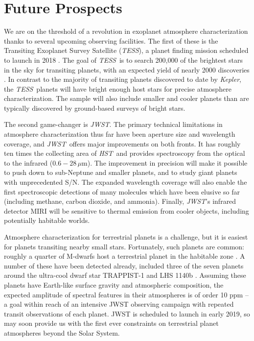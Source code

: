 \documentclass[graybox,natbib,nosecnum]{svmult}
\newcommand{\project}[1]{\textsl{#1}}
\newcommand{\JWST}{\project{JWST}}
\newcommand{\HST}{\project{HST}}
\newcommand{\TESS}{\project{TESS}}
\newcommand{\Kepler}{\project{Kepler}}
\begin{document}
\section{Future Prospects}
We are on the threshold of a revolution in exoplanet atmosphere characterization thanks to several upcoming observing facilities.  The first of these is the Transiting Exoplanet Survey Satellite (\TESS), a planet finding mission scheduled to launch in 2018 \citep{ricker14}.  The goal of \TESS\ is to search 200,000 of the brightest stars in the sky for transiting planets, with an expected yield of nearly 2000 discoveries \citep{sullivan15}. In contrast to the majority of transiting planets discovered to date by \Kepler, the \TESS\ planets will have bright enough host stars for precise atmosphere characterization. The sample will also include smaller and cooler planets than are typically discovered by ground-based surveys of bright stars. 

The second game-changer is \JWST. The primary technical limitations in atmosphere characterization thus far have been aperture size and wavelength coverage, and \JWST\ offers major improvements on both fronts. It has roughly ten times the collecting area of \HST\, and provides spectroscopy from the optical to the infrared ($0.6 - 28\,\mu$m). The improvement in precision will make it possible to push down to sub-Neptune and smaller planets, and to study giant planets with unprecedented S/N. The expanded wavelength coverage will also enable the first spectroscopic detections of many molecules which have been elusive so far (including methane, carbon dioxide, and ammonia). Finally, \JWST's infrared detector MIRI will be sensitive to thermal emission from cooler objects, including potentially habitable worlds.

Atmosphere characterization for terrestrial planets is a challenge, but it is easiest for planets transiting nearby small stars.  Fortunately, such planets are common: roughly a quarter of M-dwarfs host a terrestrial planet in the habitable zone \citep{dressing15}. A number of these have been detected already, included three of the seven planets around the ultra-cool dwarf star TRAPPIST-1 and LHS 1140b \citep{gillon17, dittmann17}. Assuming these planets have Earth-like surface gravity and atmospheric composition, the expected amplitude of spectral features in their atmospheres is of order 10 ppm -- a goal within reach of an intensive JWST observing campaign with repeated transit observations of each planet.  JWST is scheduled to launch in early 2019, so may soon provide us with the first ever constraints on terrestrial planet atmospheres beyond the Solar System. 
\end{document}
